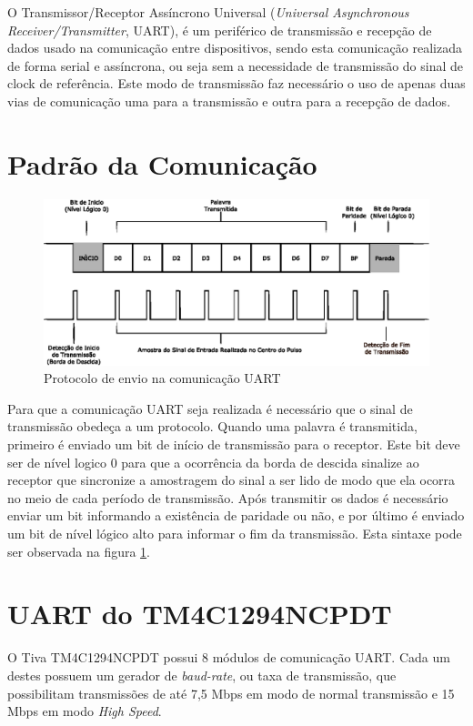 O Transmissor/Receptor Assíncrono Universal (\emph{Universal Asynchronous Receiver/Transmitter}, UART), é um periférico de transmissão e recepção de dados usado na comunicação entre dispositivos, sendo esta comunicação realizada de forma serial e assíncrona, ou seja sem a necessidade de transmissão do sinal de clock de referência. Este modo de transmissão faz necessário o uso de apenas duas vias de comunicação uma para a transmissão e outra para a recepção de dados.

\section{Padrão da Comunicação}

\begin{figure}[H]
\centering
\includegraphics[width=1\textwidth] {figuras/uart.eps}
    \caption{Protocolo de envio na comunicação UART}
    \label{fig:uart}
\end{figure}

Para que a comunicação UART seja realizada é necessário que o sinal de transmissão obedeça a um protocolo. Quando uma palavra é transmitida, primeiro é enviado um bit de início de transmissão para o receptor. Este bit deve ser de nível logico 0 para que a ocorrência da borda de descida sinalize ao receptor que sincronize a amostragem do sinal a ser lido de modo que ela ocorra no meio de cada período de transmissão.  Após transmitir os dados é necessário enviar um bit informando a existência de paridade ou não, e por último é enviado um bit de nível lógico alto para informar o fim da transmissão. Esta sintaxe pode ser observada na figura \ref{fig:uart}.

\section{UART do TM4C1294NCPDT}


O Tiva TM4C1294NCPDT possui 8 módulos de comunicação UART. Cada um destes  possuem um gerador de \emph{baud-rate}, ou taxa de transmissão, que possibilitam  transmissões de até 7,5 Mbps em modo de normal transmissão e  15 Mbps em modo \emph{High Speed}. 

